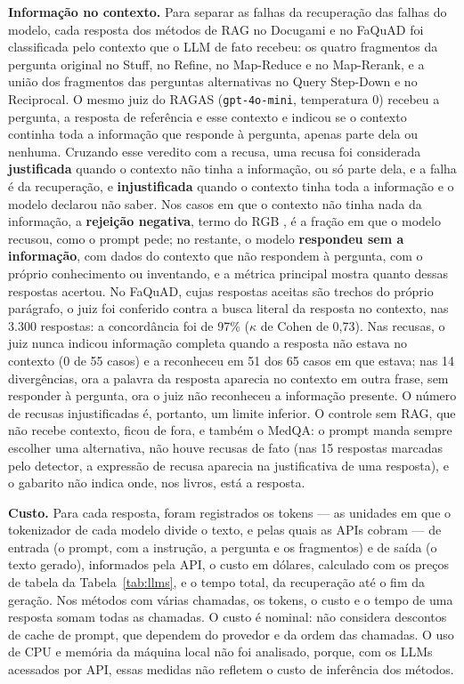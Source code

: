\textbf{Informação no contexto.} Para separar as falhas da recuperação das falhas do modelo, cada resposta dos métodos de RAG no Docugami e no FaQuAD foi classificada pelo contexto que o LLM de fato recebeu: os quatro fragmentos da pergunta original no Stuff, no Refine, no Map-Reduce e no Map-Rerank, e a união dos fragmentos das perguntas alternativas no Query Step-Down e no Reciprocal. O mesmo juiz do RAGAS (\texttt{gpt-4o-mini}, temperatura 0) recebeu a pergunta, a resposta de referência e esse contexto e indicou se o contexto continha toda a informação que responde à pergunta, apenas parte dela ou nenhuma. Cruzando esse veredito com a recusa, uma recusa foi considerada \textbf{justificada} quando o contexto não tinha a informação, ou só parte dela, e a falha é da recuperação, e \textbf{injustificada} quando o contexto tinha toda a informação e o modelo declarou não saber. Nos casos em que o contexto não tinha nada da informação, a \textbf{rejeição negativa}, termo do RGB \cite{chen2024rgb}, é a fração em que o modelo recusou, como o prompt pede; no restante, o modelo \textbf{respondeu sem a informação}, com dados do contexto que não respondem à pergunta, com o próprio conhecimento ou inventando, e a métrica principal mostra quanto dessas respostas acertou. No FaQuAD, cujas respostas aceitas são trechos do próprio parágrafo, o juiz foi conferido contra a busca literal da resposta no contexto, nas 3.300 respostas: a concordância foi de 97\% ($\kappa$ de Cohen de 0,73). Nas recusas, o juiz nunca indicou informação completa quando a resposta não estava no contexto (0 de 55 casos) e a reconheceu em 51 dos 65 casos em que estava; nas 14 divergências, ora a palavra da resposta aparecia no contexto em outra frase, sem responder à pergunta, ora o juiz não reconheceu a informação presente. O número de recusas injustificadas é, portanto, um limite inferior. O controle sem RAG, que não recebe contexto, ficou de fora, e também o MedQA: o prompt manda sempre escolher uma alternativa, não houve recusas de fato (nas 15 respostas marcadas pelo detector, a expressão de recusa aparecia na justificativa de uma resposta), e o gabarito não indica onde, nos livros, está a resposta.

\textbf{Custo.} Para cada resposta, foram registrados os tokens --- as unidades em que o tokenizador de cada modelo divide o texto, e pelas quais as APIs cobram --- de entrada (o prompt, com a instrução, a pergunta e os fragmentos) e de saída (o texto gerado), informados pela API, o custo em dólares, calculado com os preços de tabela da Tabela~\ref{tab:llms}, e o tempo total, da recuperação até o fim da geração. Nos métodos com várias chamadas, os tokens, o custo e o tempo de uma resposta somam todas as chamadas. O custo é nominal: não considera descontos de cache de prompt, que dependem do provedor e da ordem das chamadas. O uso de CPU e memória da máquina local não foi analisado, porque, com os LLMs acessados por API, essas medidas não refletem o custo de inferência dos métodos.

